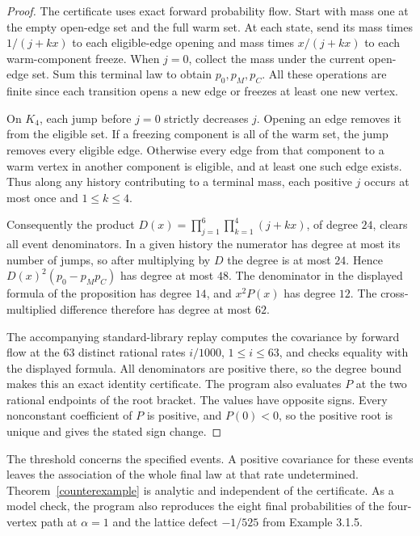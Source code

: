 \documentclass[11pt,a4paper]{amsart}
\begin{document}
\begin{proof}
The certificate uses exact forward probability flow. Start with mass one at the empty open-edge set and the full warm set. At each state, send its mass times \(1/(j+kx)\) to each eligible-edge opening and mass times \(x/(j+kx)\) to each warm-component freeze. When \(j=0\), collect the mass under the current open-edge set. Sum this terminal law to obtain \(p_0,p_M,p_C\). All these operations are finite since each transition opens a new edge or freezes at least one new vertex.

On \(K_4\), each jump before \(j=0\) strictly decreases \(j\). Opening an edge removes it from the eligible set. If a freezing component is all of the warm set, the jump removes every eligible edge. Otherwise every edge from that component to a warm vertex in another component is eligible, and at least one such edge exists. Thus along any history contributing to a terminal mass, each positive \(j\) occurs at most once and \(1\leq k\leq 4\).

Consequently the product \(D(x)=\prod_{j=1}^6\prod_{k=1}^4(j+kx)\), of degree \(24\), clears all event denominators. In a given history the numerator has degree at most its number of jumps, so after multiplying by \(D\) the degree is at most \(24\). Hence \(D(x)^2(p_0-p_Mp_C)\) has degree at most \(48\). The denominator in the displayed formula of the proposition has degree \(14\), and \(x^2P(x)\) has degree \(12\). The cross-multiplied difference therefore has degree at most \(62\).

The accompanying standard-library replay computes the covariance by forward flow at the \(63\) distinct rational rates \(i/1000\), \(1\leq i\leq 63\), and checks equality with the displayed formula. All denominators are positive there, so the degree bound makes this an exact identity certificate. The program also evaluates \(P\) at the two rational endpoints of the root bracket. The values have opposite signs. Every nonconstant coefficient of \(P\) is positive, and \(P(0)<0\), so the positive root is unique and gives the stated sign change.
\end{proof}

The threshold concerns the specified events. A positive covariance for these events leaves the association of the whole final law at that rate undetermined. Theorem~\ref{counterexample} is analytic and independent of the certificate. As a model check, the program also reproduces the eight final probabilities of the four-vertex path at \(\alpha=1\) and the lattice defect \(-1/525\) from Example 3.1.5.
\end{document}
